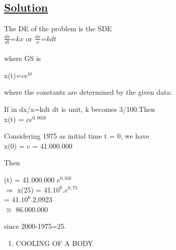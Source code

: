 \documentclass[11pt]{amsbook}
\begin{document}
 
    
	
  

\subsection*{\underline{Solution}}
    The DE of the problem is the SDE\\
 
   
     
\hspace{50pt}$\frac{dx}{dt}$=$kx$ \hspace{16pt}or \hspace{16pt}$\frac{dx}{x}$=$kdt$\\\\
where GS is

\hspace{3cm}x(t)=$ce^{kt}$\\

\par\noindent
    where the constants are determined by the given data:\\
\par
    If in dx/x=kdt dt is unit, k becomes 3/100.Then\\ 

\hspace{50pt} x(t) = $ce^{0,003t}$\\
     

\par
    Considering 1975 as initial time t = 0, we have\\ 

\hspace{50pt}  x(0) = c = 41.000.000
     
\par Then

 

 

 
 \begin{center}
  (t) = 41.000.000 $e^{0,03t}$\\
  \hspace{-3cm}$\Longrightarrow$\hspace{4pt} x(25) = 41.$10^6$.$e^{0,75}$\\
  = 41.$10^6$.2,0923\\
  $\cong$  86.000.000\\
  \end{center}
 since 2000-1975=25.\\
 
\begin{enumerate}[label= \Alph*.]
     \item COOLING OF A BODY 
\end{enumerate}
    
\end{document}
